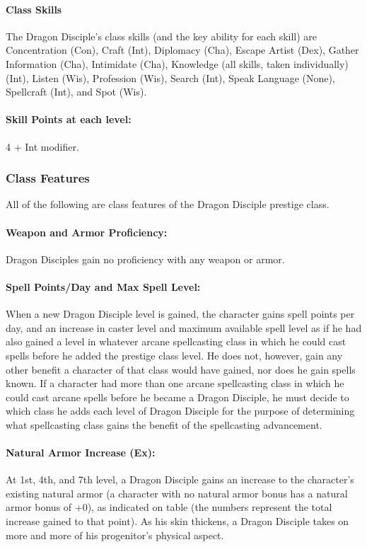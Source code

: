\paragraph{Class Skills}
The Dragon Disciple's class skills (and the key ability for each skill) are Concentration (Con), Craft (Int), Diplomacy (Cha), 
Escape Artist (Dex), Gather Information (Cha), Intimidate (Cha), Knowledge (all skills, taken individually) (Int), 
Listen (Wis), Profession (Wis), Search (Int), Speak Language (None), Spellcraft (Int), and Spot (Wis).
\paragraph{Skill Points at each level:} 4 + Int modifier.
\subsubsection{Class Features}
All of the following are class features of the Dragon Disciple prestige class.

\paragraph{Weapon and Armor Proficiency:}
Dragon Disciples gain no proficiency with any weapon or armor.

\paragraph{Spell Points/Day and Max Spell Level:} 
When a new Dragon Disciple level is gained, the character gains spell points per day, and an increase in caster level and maximum available spell level as if he had also gained a level in whatever arcane spellcasting class in which he could cast spells before he added the prestige class level. 
He does not, however, gain any other benefit a character of that class would have gained, nor does he gain spells known. 
If a character had more than one arcane spellcasting class in which he could cast arcane spells before he became a Dragon Disciple, 
he must decide to which class he adds each level of Dragon Disciple for the purpose of determining what spellcasting class gains the benefit of the spellcasting advancement.

\paragraph{Natural Armor Increase (Ex):}
At 1st, 4th, and 7th level, a Dragon Disciple gains an increase to the character's existing natural armor (a character with no natural armor bonus has a natural armor bonus of +0), as indicated on  table (the numbers represent the total increase gained to that point). 
As his skin thickens, a Dragon Disciple takes on more and more of his progenitor's physical aspect.

